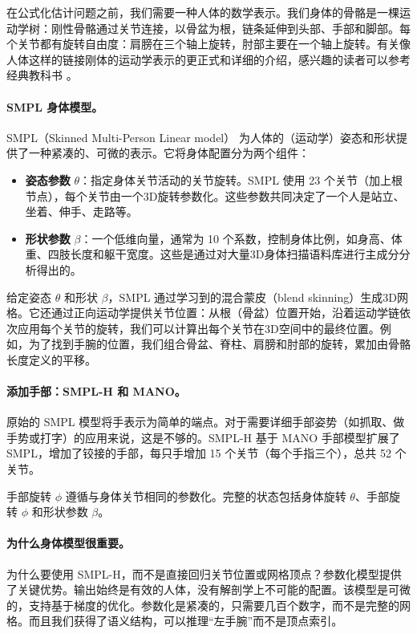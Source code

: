 \documentclass[../../book-main_zh.tex]{subfiles}
\begin{document}
在公式化估计问题之前，我们需要一种人体的数学表示。我们身体的骨骼是一棵运动学树：刚性骨骼通过关节连接，以骨盆为根，链条延伸到头部、手部和脚部。每个关节都有旋转自由度：肩膀在三个轴上旋转，肘部主要在一个轴上旋转。有关像人体这样的链接刚体的运动学表示的更正式和详细的介绍，感兴趣的读者可以参考经典教科书 \cite{MurrayR1994}。

\paragraph{SMPL 身体模型。}
SMPL（Skinned Multi-Person Linear model）\citep{loper2015smpl} 为人体的（运动学）姿态和形状提供了一种紧凑的、可微的表示。它将身体配置分为两个组件：
\begin{itemize}
    \item \textbf{姿态参数} $\theta$：指定身体关节活动的关节旋转。SMPL 使用 23 个关节（加上根节点），每个关节由一个3D旋转参数化。这些参数共同决定了一个人是站立、坐着、伸手、走路等。
    \item \textbf{形状参数} $\beta$：一个低维向量，通常为 10 个系数，控制身体比例，如身高、体重、四肢长度和躯干宽度。这些是通过对大量3D身体扫描语料库进行主成分分析得出的。
\end{itemize}

给定姿态 $\theta$ 和形状 $\beta$，SMPL 通过学习到的混合蒙皮（blend skinning）生成3D网格。它还通过正向运动学提供关节位置：从根（骨盆）位置开始，沿着运动学链依次应用每个关节的旋转，我们可以计算出每个关节在3D空间中的最终位置。例如，为了找到手腕的位置，我们组合骨盆、脊柱、肩膀和肘部的旋转，累加由骨骼长度定义的平移。

\paragraph{添加手部：SMPL-H 和 MANO。}
原始的 SMPL 模型将手表示为简单的端点。对于需要详细手部姿势（如抓取、做手势或打字）的应用来说，这是不够的。SMPL-H \citep{romero2017embodied} 基于 MANO 手部模型扩展了 SMPL，增加了铰接的手部，每只手增加 15 个关节（每个手指三个），总共 52 个关节。

手部旋转 $\phi$ 遵循与身体关节相同的参数化。完整的状态包括身体旋转 $\theta$、手部旋转 $\phi$ 和形状参数 $\beta$。

\paragraph{为什么身体模型很重要。}
为什么要使用 SMPL-H，而不是直接回归关节位置或网格顶点？参数化模型提供了关键优势。输出始终是有效的人体，没有解剖学上不可能的配置。该模型是可微的，支持基于梯度的优化。参数化是紧凑的，只需要几百个数字，而不是完整的网格。而且我们获得了语义结构，可以推理“左手腕”而不是顶点索引。
\end{document}

